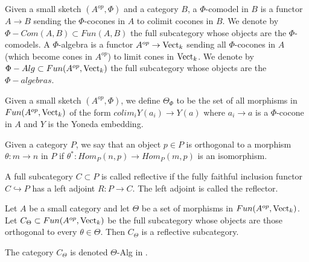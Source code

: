 \begin{definition}
  \noindent Given a small sketch $(A^{op},\Phi)$ and a category $B$, a
  $\Phi$-comodel in $B$ is a functor $A\to B$ sending the $\Phi$-cocones in
  $A$ to colimit cocones in $B$. We denote by $\Phi-Com(A,B)\subset Fun(A,B)$
  the full subcategory whose objects are the $\Phi$-comodels. A $\Phi$-algebra
  is a functor $A^{op}\to \operatorname{Vect}_k$ sending all $\Phi$-cocones in $A$ (which
  become cones in $A^{op}$) to limit cones in $\operatorname{Vect}_k$. We denote by
  $\Phi-Alg\subset Fun(A^{op},\operatorname{Vect}_k)$ the full subcategory whose objects are
  the $\Phi-algebras$.
\end{definition}


\begin{definition}

  \noindent Given a small sketch $(A^{op},\Phi)$, we define $\Theta_{\Phi}$ to
  be the set of all morphisms in $Fun(A^{op},\operatorname{Vect}_k)$ of the form $colim_i
  Y(a_i)\to Y(a)$ where $a_i\to a$ is a $\Phi$-cocone in $A$ and $Y$ is the
  Yoneda embedding.
\end{definition}

\begin{definition}

  \noindent Given a category $P$, we say that an object $p\in P$ is orthogonal
  to a morphism $\theta:m\to n$ in $P$ if $\theta^*:Hom_P(n,p)\to Hom_P(m,p)$
  is an isomorphism.
\end{definition}

\begin{definition}
  \noindent A full subcategory $C\subset P$ is called reflective if the fully
  faithful inclusion functor $C\hookrightarrow P$ has a left adjoint $R:P\to
  C$. The left adjoint is called the reflector.
\end{definition}

\begin{theorem}\cite[Theorem 6.5]{kelly/basic-concepts-enriched}\label{reflective}

  \noindent Let $A$ be a small category and let $\Theta$ be a set of morphisms
  in $Fun(A^{op},\operatorname{Vect}_k)$. Let $C_{\Theta}\subset Fun(A^{op},\operatorname{Vect}_k)$ be the
  full subcategory whose objects are those orthogonal to every
  $\theta\in\Theta$. Then $C_{\Theta}$ is a reflective subcategory.
\end{theorem}

\begin{remark}
  The category $C_{\Theta}$ is denoted $\Theta$-Alg in
  \cite{kelly/basic-concepts-enriched}.
\end{remark}


